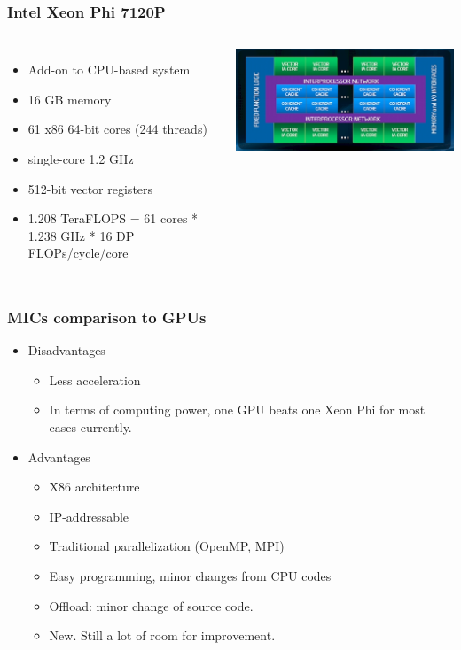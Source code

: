 \documentclass[10pt,t]{beamer}
\begin{document}
\begin{frame}
\frametitle{Intel Xeon Phi 7120P}
\begin{columns}[c]
\begin{itemize}
\item Add-on to CPU-based system
\item 16 GB memory
\item 61 x86 64-bit cores (244 threads)
\item single-core 1.2 GHz
\item 512-bit vector registers
\item 1.208 TeraFLOPS = 61 cores * 1.238 GHz * 16 DP FLOPs/cycle/core
\end{itemize}
\includegraphics[width=\textwidth]{./intel_hpc_mica}
\end{columns}
\end{frame}

\begin{frame}
\frametitle{MICs comparison to GPUs}
\begin{itemize}
\item Disadvantages
\begin{itemize}
\item Less acceleration
\item In terms of computing power, one GPU beats one Xeon Phi
for most cases currently.
\end{itemize}
\item Advantages
\begin{itemize}
\item X86 architecture
\item IP-addressable
\item Traditional parallelization (OpenMP, MPI)
\item Easy programming, minor changes from CPU codes
\item Offload: minor change of source code.
\item New. Still a lot of room for improvement.
\end{itemize}
\end{itemize}
\end{frame}
\end{document}
